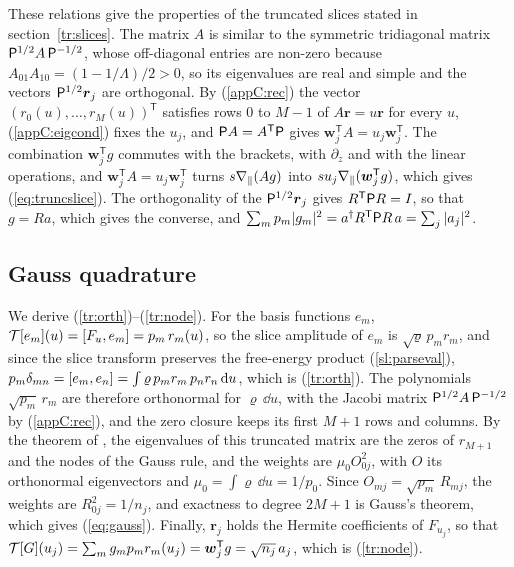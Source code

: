 These relations give the properties of the truncated slices stated in section~\ref{tr:slices}. The matrix $A$ is similar to the symmetric tridiagonal matrix $\mathsf P^{1/2}A\,\mathsf P^{-1/2}$, whose off-diagonal entries are non-zero because $A_{01}A_{10}=(1-1/\Lambda)/2>0$, so its eigenvalues are real and simple and the vectors $\mathsf P^{1/2}\boldsymbol r_j$ are orthogonal. By (\ref{appC:rec}) the vector $(r_0(u),\dots,r_M(u))^{\mathsf T}$ satisfies rows $0$ to $M-1$ of $A\boldsymbol r=u\boldsymbol r$ for every $u$, (\ref{appC:eigcond}) fixes the $u_j$, and $\mathsf P A=A^{\mathsf T}\mathsf P$ gives $\boldsymbol w_j^{\mathsf T}A=u_j\boldsymbol w_j^{\mathsf T}$. The combination $\boldsymbol w_j^{\mathsf T}g$ commutes with the brackets, with $\partial_z$ and with the linear operations, and $\boldsymbol w_j^{\mathsf T}A=u_j\boldsymbol w_j^{\mathsf T}$ turns $s\nabla_\parallel(Ag)$ into $su_j\nabla_\parallel(\boldsymbol w_j^{\mathsf T}g)$, which gives (\ref{eq:truncslice}). The orthogonality of the $\mathsf P^{1/2}\boldsymbol r_j$ gives $R^{\mathsf T}\mathsf P R=I$, so that $g=Ra$, which gives the converse, and $\sum_mp_m|g_m|^2=a^\dagger R^{\mathsf T}\mathsf P R\,a=\sum_j|a_j|^2$.

\subsection{Gauss quadrature}

We derive (\ref{tr:orth})--(\ref{tr:node}). For the basis functions $e_m$, $\mathcal T[e_m](u)=[F_u,e_m]=p_m\,r_m(u)$, so the slice amplitude of $e_m$ is $\sqrt\varrho\,p_mr_m$, and since the slice transform preserves the free-energy product (\ref{sl:parseval}), $p_m\delta_{mn}=[e_m,e_n]=\int\varrho\,p_mr_m\,p_nr_n\,\mathrm{d} u$, which is (\ref{tr:orth}). The polynomials $\sqrt{p_m}\,r_m$ are therefore orthonormal for $\varrho\,\dd u$, with the Jacobi matrix $\mathsf P^{1/2}A\,\mathsf P^{-1/2}$ by (\ref{appC:rec}), and the zero closure keeps its first $M+1$ rows and columns. By the theorem of \citet{GolubWelsch1969}, the eigenvalues of this truncated matrix are the zeros of $r_{M+1}$ and the nodes of the Gauss rule, and the weights are $\mu_0O_{0j}^2$, with $O$ its orthonormal eigenvectors and $\mu_0=\int\varrho\,\dd u=1/p_0$. Since $O_{mj}=\sqrt{p_m}\,R_{mj}$, the weights are $R_{0j}^2=1/n_j$, and exactness to degree $2M+1$ is Gauss's theorem, which gives (\ref{eq:gauss}). Finally, $\boldsymbol r_j$ holds the Hermite coefficients of $F_{u_j}$, so that $\mathcal T[G](u_j)=\sum_mg_mp_mr_m(u_j)=\boldsymbol w_j^{\mathsf T}g=\sqrt{n_j}\,a_j$, which is (\ref{tr:node}).

